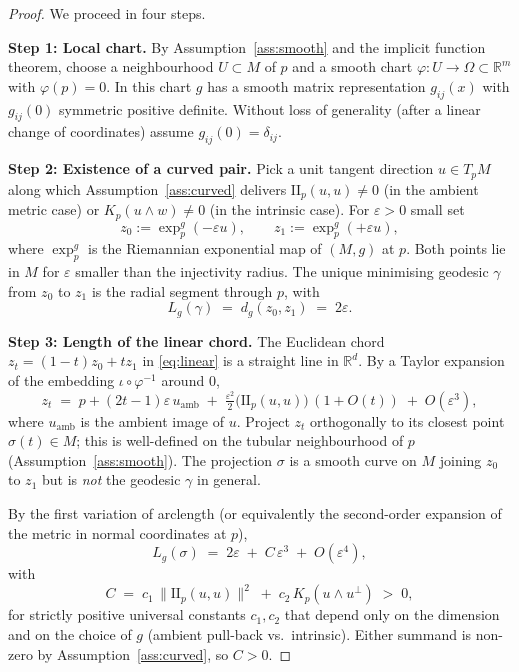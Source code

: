 \documentclass[11pt]{article}
\begin{document}
\begin{proof}
We proceed in four steps.

\medskip
\noindent\textbf{Step 1: Local chart.}
By Assumption~\ref{ass:smooth} and the implicit function theorem,
choose a neighbourhood $U \subset M$ of $p$ and a smooth chart
$\varphi : U \to \Omega \subset \mathbb{R}^m$ with $\varphi(p)=0$.
In this chart $g$ has a smooth matrix representation
$g_{ij}(x)$ with $g_{ij}(0)$ symmetric positive definite. Without loss
of generality (after a linear change of coordinates) assume
$g_{ij}(0) = \delta_{ij}$.

\medskip
\noindent\textbf{Step 2: Existence of a curved pair.}
Pick a unit tangent direction $u \in T_p M$ along which
Assumption~\ref{ass:curved} delivers $\mathrm{II}_p(u,u) \neq 0$
(in the ambient metric case) or $K_p(u\wedge w) \neq 0$
(in the intrinsic case). For $\varepsilon > 0$ small set
\[
  z_0 := \exp_p^{g}(-\varepsilon u), \qquad
  z_1 := \exp_p^{g}(+\varepsilon u),
\]
where $\exp_p^g$ is the Riemannian exponential map of $(M,g)$ at $p$.
Both points lie in $M$ for $\varepsilon$ smaller than the injectivity
radius. The unique minimising geodesic $\gamma$ from $z_0$ to $z_1$
is the radial segment through $p$, with
\[
  L_g(\gamma) \;=\; d_g(z_0, z_1) \;=\; 2\varepsilon.
\]

\medskip
\noindent\textbf{Step 3: Length of the linear chord.}
The Euclidean chord $z_t = (1-t)z_0 + t z_1$ in
\eqref{eq:linear} is a straight line in $\mathbb{R}^d$. By a Taylor
expansion of the embedding $\iota \circ \varphi^{-1}$ around $0$,
\[
  z_t \;=\; p + (2t-1)\varepsilon\, u_{\!\text{amb}}
       \;+\; \tfrac{\varepsilon^2}{2}\bigl(\mathrm{II}_p(u,u)\bigr)\,(1 + O(t))
       \;+\; O(\varepsilon^3),
\]
where $u_{\mathrm{amb}}$ is the ambient image of $u$. Project $z_t$
orthogonally to its closest point $\sigma(t) \in M$; this is well-defined
on the tubular neighbourhood of $p$ (Assumption~\ref{ass:smooth}).
The projection $\sigma$ is a smooth curve on $M$ joining $z_0$ to $z_1$
but is \emph{not} the geodesic $\gamma$ in general.

By the first variation of arclength (or equivalently the second-order
expansion of the metric in normal coordinates at $p$),
\begin{equation}\label{eq:chord-expansion}
  L_g(\sigma)
  \;=\; 2\varepsilon \;+\; C\,\varepsilon^{3}\;+\; O(\varepsilon^{4}),
\end{equation}
with
\[
  C \;=\; c_1 \, \|\mathrm{II}_p(u,u)\|^{2}
       \;+\; c_2 \, K_p(u \wedge u^{\perp})
       \;>\; 0,
\]
for strictly positive universal constants $c_1, c_2$ that depend only
on the dimension and on the choice of $g$ (ambient pull-back vs.\
intrinsic). Either summand is non-zero by Assumption~\ref{ass:curved},
so $C > 0$.


\end{proof}
\end{document}
